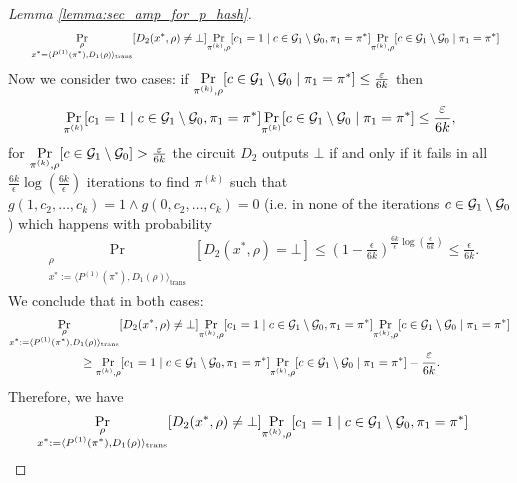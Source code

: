 \begin{proof}[Lemma \ref{lemma:sec_amp_for_p_hash}]
\begin{align}
  &\mbox\qquad \underset{\substack{\rho \\ x^* = \langle P^{(1)}(\pi^*), D_1(\rho) \rangle_{\text{trans}}}}{\Pr}[D_2(x^*,\rho) \neq \bot]
  \underset{\pi^{(k)}, \rho}{\Pr}[c_1 = 1 \mid c \in \mathcal{G}_1 \setminus \mathcal{G}_0, \pi_1 = \pi^*]
  \underset{\pi^{(k)}, \rho}{\Pr}[c \in \mathcal{G}_1 \setminus \mathcal{G}_0 \mid \pi_1 = \pi^*]
\end{align}
Now we consider two cases:
if $\underset{\pi^{(k)}, \rho}{\Pr}[ c \in \mathcal{G}_1 \setminus \mathcal{G}_0 \mid \pi_1 = \pi^*] \leq \frac{\varepsilon}{6k}$ then
\begin{align}
  \underset{\pi^{(k)}}{\Pr}[c_1 = 1 \mid c \in \mathcal{G}_1 \setminus \mathcal{G}_0, \pi_1 = \pi^*] \underset{\pi^{(k)}}{\Pr}[c \in \mathcal{G}_1 \setminus \mathcal{G}_0 \mid \pi_1 = \pi^*] \leq \frac{\varepsilon}{6k},
\end{align}
for $\underset{\pi^{(k)}, \rho}{\Pr}[c \in \mathcal{G}_1 \setminus \mathcal{G}_0] > \frac{\varepsilon}{6k}$ the circuit $D_2$ outputs $\bot$
if and only if it fails in all $\frac{6k}{\epsilon} \log(\frac{6k}{\epsilon})$ iterations to find $\pi^{(k)}$ such that $g(1, c_2, \dots, c_k) = 1 \land g(0, c_2, \dots, c_k) = 0$
(i.e. in none of the iterations $c \in \mathcal{G}_1 \setminus \mathcal{G}_0$) which happens with probability
\begin{align}
\underset{\substack{\rho \\ x^* := \langle P^{(1)}(\pi^*), D_1(\rho) \rangle_{\text{trans}}}}{\Pr}[D_2(x^*,\rho) = \bot]
\leq (1 - \frac{\epsilon}{6k})^{\frac{6k}{\epsilon}\log(\frac{\epsilon}{6k})} \leq \frac{\epsilon}{6k}.
\end{align}
We conclude that in both cases:
\begin{align}
  &\underset{\substack{\rho \\ x^* := \langle P^{(1)}(\pi^*), D_1(\rho) \rangle_{\text{trans}}}}{\Pr}[D_2(x^*,\rho) \neq \bot]
  \underset{\pi^{(k)}, \rho}{\Pr}[c_1 = 1 \mid c \in \mathcal{G}_1 \setminus \mathcal{G}_0, \pi_1 = \pi^*]
  \underset{\pi^{(k)}, \rho}{\Pr}[c \in \mathcal{G}_1 \setminus \mathcal{G}_0 \mid \pi_1 = \pi^*] \notag\\
  &\mbox\qquad\qquad\qquad \geq \underset{\pi^{(k)}, \rho}{\Pr}[c_1 = 1 \mid c \in \mathcal{G}_1 \setminus \mathcal{G}_0, \pi_1 = \pi^*]\underset{\pi^{(k)}, \rho}{\Pr}[c \in \mathcal{G}_1 \setminus \mathcal{G}_0 \mid \pi_1 = \pi^*] - \frac{\varepsilon}{6k}.
\end{align}
Therefore, we have
\begin{align*}
  &\underset{\substack{\rho \\ x^* := \langle P^{(1)}(\pi^*), D_1(\rho) \rangle_{\text{trans}}}}{\Pr}[D_2(x^*,\rho) \neq \bot]
  \underset{\pi^{(k)}, \rho}{\Pr}[c_1 = 1 \mid c \in \cG_1 \setminus \cG_0, \pi_1 = \pi^*]

\end{align*}
\end{proof}
